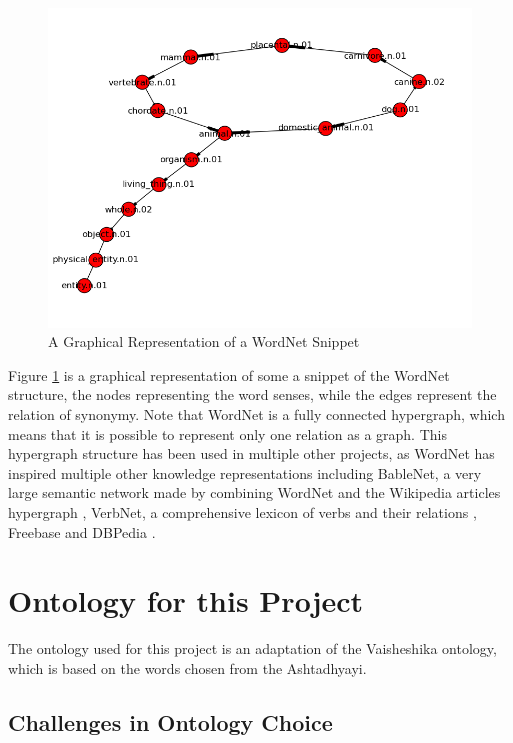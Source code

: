 \documentclass[final, 12pt]{elsarticle}
\begin{document}
\begin{figure}
    \centering
    \includegraphics[width=13.5cm]{GraphWordNet.png}
    \caption{A Graphical Representation of a WordNet Snippet}
    \label{fig: wordnet-graph}
\end{figure}

Figure \ref{fig: wordnet-graph} is a graphical representation of some a snippet of the WordNet structure, the nodes representing the word senses, while the edges represent the relation of synonymy. Note that WordNet is a fully connected hypergraph, which means that it is possible to represent only one relation as a graph. This hypergraph structure has been used in multiple other projects, as WordNet has inspired multiple other knowledge representations including BableNet, a very large semantic network made by combining WordNet and the Wikipedia articles hypergraph \citep{navigli2010babelnet}, VerbNet, a comprehensive lexicon of verbs and their relations \citep{schuler2005verbnet}, Freebase \citep{bollacker2008freebase} and DBPedia \citep{auer2007dbpedia}.

\section{Ontology for this Project}
\label{sec: my_onto}

The ontology used for this project is an adaptation of the Vaisheshika ontology, which is based on the words chosen from the Ashtadhyayi. 

\subsection{Challenges in Ontology Choice}
\end{document}
